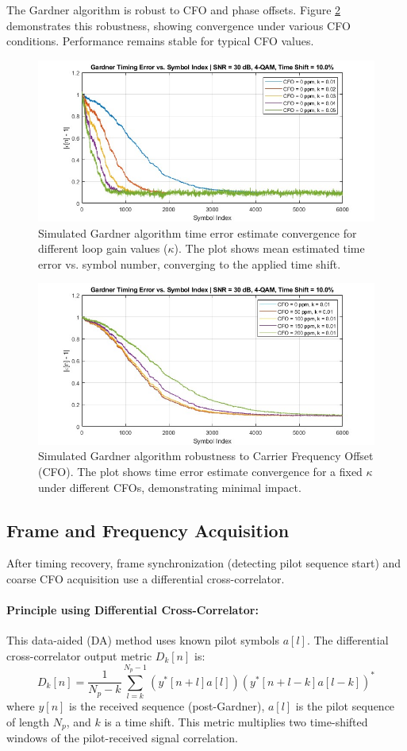 \documentclass[11pt]{article}
\begin{document}
	The Gardner algorithm is robust to CFO and phase offsets. Figure \ref{fig:gardner2} demonstrates this robustness, showing convergence under various CFO conditions. Performance remains stable for typical CFO values.
	
	\begin{figure}[H]
		\centering
		\includegraphics[width=0.7\linewidth]{Images/Gardner_k_list.jpg} 
		\caption{Simulated Gardner algorithm time error estimate convergence for different loop gain values ($\kappa$). The plot shows mean estimated time error vs. symbol number, converging to the applied time shift.}
		\label{fig:gardner1}
	\end{figure}
	
	\begin{figure}[H]
		\centering
		\includegraphics[width=0.7\linewidth]{Images/Gardner_CFO_robust.jpg} 
		\caption{Simulated Gardner algorithm robustness to Carrier Frequency Offset (CFO). The plot shows time error estimate convergence for a fixed $\kappa$ under different CFOs, demonstrating minimal impact.}
		\label{fig:gardner2}
	\end{figure}
	
	\subsection{Frame and Frequency Acquisition}
	After timing recovery, frame synchronization (detecting pilot sequence start) and coarse CFO acquisition use a differential cross-correlator.
	
	\paragraph{Principle using Differential Cross-Correlator:}
	This data-aided (DA) method uses known pilot symbols $a[l]$. The differential cross-correlator output metric $D_k[n]$ is:
	\begin{equation}
		D_k[n] = \frac{1}{N_p-k} \sum_{l=k}^{N_p-1} (y^*[n+l]a[l])(y^*[n+l-k]a[l-k])^*
		\label{eq:diff_corr_metric_style_change}
	\end{equation}
	where $y[n]$ is the received sequence (post-Gardner), $a[l]$ is the pilot sequence of length $N_p$, and $k$ is a time shift. This metric multiplies two time-shifted windows of the pilot-received signal correlation.
	
\end{document}
